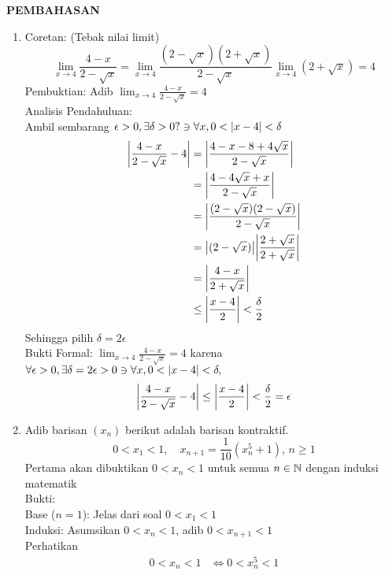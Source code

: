 \documentclass{article}
\begin{document}



\begin{center}
\textbf{\large{PEMBAHASAN}}
\end{center}
\begin{enumerate}[leftmargin=*, label={\arabic*}.]
\item Coretan: (Tebak nilai limit)
\[
\lim_{x\to 4} \frac{4-x}{2-\sqrt{x}}=
\lim_{x\to 4} \frac{(2-\sqrt{x})(2+\sqrt{x})}{2-\sqrt{x}}
\lim_{x\to 4} (2+\sqrt{x}) = 4
\]
Pembuktian: Adib $\lim_{x\to 4} \frac{4-x}{2-\sqrt{x}}=4$\\
Analisis Pendahuluan:\\
Ambil sembarang $\epsilon > 0, \exists \delta > 0? \ni \forall x, 0 < \abs{x-4}<\delta$ 
\begin{align*}
    \abs*{\frac{4-x}{2-\sqrt{x}}-4} &= \abs*{\frac{4-x-8+4\sqrt{x}}{2-\sqrt{x}}}
    \\&=\abs*{\frac{4-4\sqrt{x}+x}{2-\sqrt{x}}}
    \\&=\abs*{\frac{(2-\sqrt{x})(2-\sqrt{x})}{2-\sqrt{x}}}
    \\&=\abs*{(2-\sqrt{x})}\abs*{\frac{2+\sqrt{x}}{2+\sqrt{x}}}
    \\&=\abs*{\frac{4-x}{2+\sqrt{x}}}
    \\&\leq\abs*{\frac{x-4}{2}} < \frac{\delta}{2}
\end{align*}
Sehingga pilih $\delta = 2\epsilon$\\
Bukti Formal: $\lim_{x\to 4} \frac{4-x}{2-\sqrt{x}}=4$ karena\\
$\forall \epsilon > 0, \exists \delta = 2\epsilon > 0 \ni \forall x, 0 < \abs{x-4} < \delta,$
\[
    \abs*{\frac{4-x}{2-\sqrt{x}}-4} \leq\abs*{\frac{x-4}{2}} < \frac{\delta}{2} = \epsilon
\]
\item Adib barisan $(x_n)$ berikut adalah barisan kontraktif.
\[
    0 < x_1 < 1, \quad x_{n+1}=\frac{1}{10}(x_n^5+1),\, n\geq 1
\]
Pertama akan dibuktikan $0 < x_n < 1$ untuk semua $n \in \N$ dengan induksi matematik\\
Bukti:\\
Base ($n=1$): Jelas dari soal $0 < x_1 < 1$\\
Induksi: Asumsikan $0 < x_n < 1$, adib $0 < x_{n+1} < 1$\\
Perhatikan
\begin{align*}
    0 < x_n < 1 & \iff 0 < x_n^5 < 1\\

\end{align*}
\end{enumerate}
\end{document}
